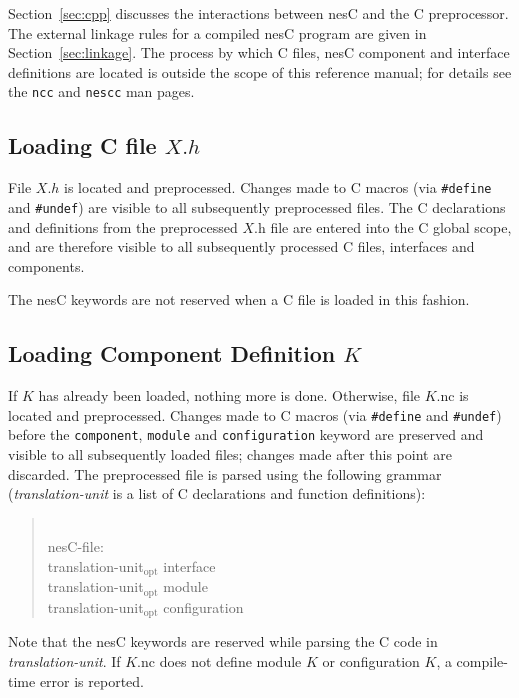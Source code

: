 \documentclass[11pt,letterpaper]{article}
\newcommand{\kw}[1]{{\tt #1}}
\newcommand{\code}[1]{{\tt #1}}
\newcommand{\file}[1]{{\tt #1}}
\newcommand{\nesc}{nesC\xspace}
\newcommand{\opt}{$_{\mbox{opt}}$\xspace}
\newcommand{\grammarshift}{\vspace*{-.7cm}}
\newcommand{\grammarindent}{\hspace*{2cm}\= \\ \kill}
\begin{document}
Section~\ref{sec:cpp} discusses the interactions between \nesc and the C
preprocessor. The external linkage rules for a compiled \nesc program are
given in Section~\ref{sec:linkage}. The process by which C files, \nesc
component and interface definitions are located is outside the scope of
this reference manual; for details see the \file{ncc} and \kw{nescc} man
pages.


\subsection{Loading C file $X.h$}
\label{sec:load-c}

File $X.h$ is located and preprocessed. Changes made to C macros (via
\code{\#define} and \code{\#undef}) are visible to all subsequently
preprocessed files. The C declarations and definitions from the
preprocessed $X$.h file are entered into the C global scope, and are
therefore visible to all subsequently processed C files, interfaces and
components. 

The \nesc keywords are not reserved when a C file is loaded in this
fashion.

\subsection{Loading Component Definition $K$}
\label{sec:load-component}

If $K$ has already been loaded, nothing more is done. Otherwise, file
$K$.nc is located and preprocessed. Changes made to C macros (via
\code{\#define} and \code{\#undef}) before the \kw{component}, \kw{module}
and \kw{configuration} keyword are preserved and visible to all
subsequently loaded files; changes made after this point are discarded. The
preprocessed file is parsed using the following grammar 
(\emph{translation-unit} is a list of C declarations and function definitions):
\begin{quote} \grammarshift \em \begin{tabbing}
\grammarindent
nesC-file: \\
\>	translation-unit\opt interface\\
\>	translation-unit\opt module\\
\>	translation-unit\opt configuration
\end{tabbing} \end{quote}
Note that the \nesc keywords are reserved while parsing the C code in
\emph{translation-unit}. If $K$.nc does not define module $K$ or
configuration $K$, a compile-time error is reported.
\end{document}

